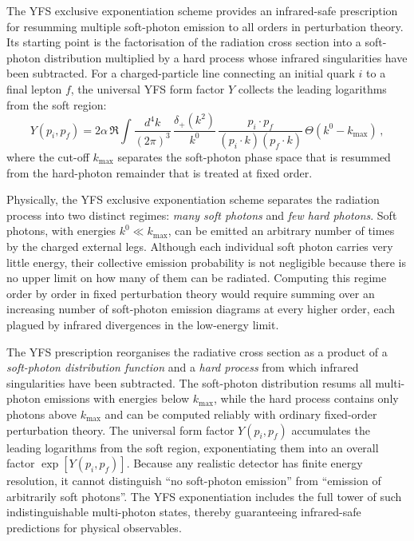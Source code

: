 The YFS exclusive exponentiation scheme provides an infrared-safe prescription for resumming multiple soft-photon emission to all orders in perturbation theory. Its starting point is the factorisation of the radiation cross section into a soft-photon distribution multiplied by a hard process whose infrared singularities have been subtracted. For a charged-particle line connecting an initial quark $i$ to a final lepton $f$, the universal YFS form factor $Y$ collects the leading logarithms from the soft region:
\begin{equation}
    Y(p_i,p_f) = 2\alpha\,\Re\!
    \int\!\frac{d^4 k}{(2\pi)^3}\,
    \frac{\delta_+(k^2)}{k^0}\,
    \frac{p_i\cdot p_f}{(p_i\cdot k)(p_f\cdot k)}\,
    \Theta(k^0 - k_{\max})\,,
    \label{eq:yfs_form_factor}
\end{equation}
where the cut-off $k_{\max}$ separates the soft-photon phase space that is resummed from the hard-photon remainder that is treated at fixed order.

Physically, the YFS exclusive exponentiation scheme separates the radiation process into
two distinct regimes: \emph{many soft photons} and \emph{few hard photons}.
Soft photons, with energies $k^0 \ll k_{\max}$, can be emitted an arbitrary number of
times by the charged external legs. Although each individual soft photon carries very
little energy, their collective emission probability is not negligible because there is
no upper limit on how many of them can be radiated. Computing this regime order by order
in fixed perturbation theory would require summing over an increasing number of
soft-photon emission diagrams at every higher order, each plagued by infrared
divergences in the low-energy limit.

The YFS prescription reorganises the radiative cross section as a product of a
\emph{soft-photon distribution function} and a \emph{hard process} from which infrared
singularities have been subtracted. The soft-photon distribution resums all multi-photon
emissions with energies below $k_{\max}$, while the hard process contains only photons
above $k_{\max}$ and can be computed reliably with ordinary fixed-order perturbation
theory. The universal form factor $Y(p_i,p_f)$ accumulates the leading logarithms from
the soft region, exponentiating them into an overall factor $\exp[Y(p_i,p_f)]$.
Because any realistic detector has finite energy resolution, it cannot distinguish
``no soft-photon emission'' from ``emission of arbitrarily soft photons''. The YFS
exponentiation includes the full tower of such indistinguishable multi-photon states,
thereby guaranteeing infrared-safe predictions for physical observables.

